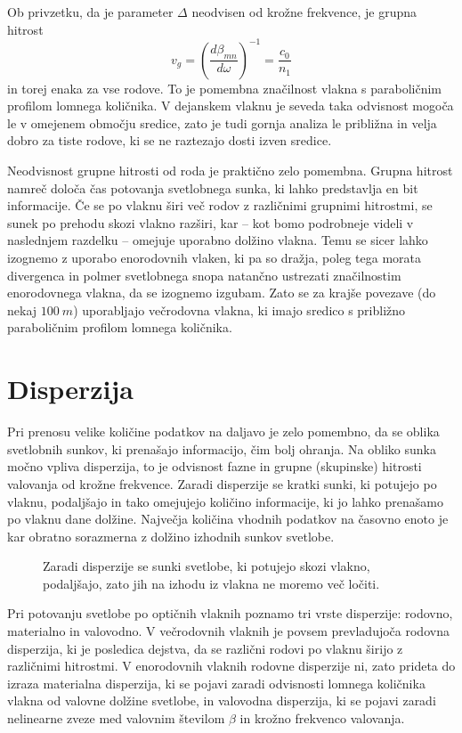 Ob privzetku, da je parameter $\Delta$ neodvisen od krožne frekvence, je grupna 
hitrost
\begin{equation}
v_{g}=\left(\frac{d\beta_{mn}}{d\omega}\right)^{-1}=\frac{c_{0}}{n_{1}}
\label{9.21}
\end{equation}
in torej enaka za vse rodove. To je pomembna značilnost vlakna s paraboličnim profilom
lomnega količnika. V dejanskem vlaknu je seveda taka odvisnost mogoča
le v omejenem območju sredice, zato je tudi gornja analiza le približna
in velja dobro za tiste rodove, ki se ne raztezajo dosti izven sredice.

Neodvisnost grupne hitrosti od roda je praktično zelo pomembna. 
Grupna hitrost namreč določa čas potovanja svetlobnega sunka, ki
lahko predstavlja en bit informacije. Če se po vlaknu širi več
rodov z različnimi grupnimi hitrostmi, se sunek po prehodu skozi
vlakno razširi, kar -- kot bomo podrobneje videli v naslednjem razdelku -- omejuje 
uporabno dolžino vlakna. Temu se sicer lahko izognemo z uporabo enorodovnih vlaken,
ki pa so dražja, poleg tega morata divergenca in polmer svetlobnega snopa 
natančno ustrezati značilnostim enorodovnega vlakna, da se izognemo izgubam. 
Zato se za krajše povezave (do nekaj $100~\si{m}$) uporabljajo večrodovna vlakna, ki imajo sredico s 
približno paraboličnim profilom lomnega količnika.

\section{Disperzija}
\label{chap:Disperzija}
Pri prenosu velike količine podatkov na daljavo je zelo pomembno, da
se oblika svetlobnih sunkov, ki prenašajo informacijo, čim bolj ohranja.
Na obliko sunka močno vpliva disperzija, to je odvisnost fazne in grupne (skupinske) hitrosti
valovanja od krožne frekvence. Zaradi disperzije se kratki sunki, ki potujejo po vlaknu, podaljšajo in 
tako omejujejo količino informacije, ki jo lahko prenašamo po vlaknu dane dolžine.
Največja količina vhodnih podatkov na časovno enoto je kar 
obratno sorazmerna z dolžino izhodnih sunkov svetlobe. 
\begin{figure}[h]
\centering
\def\svgwidth{120truemm} 
 
\caption{Zaradi disperzije se sunki svetlobe, ki potujejo skozi vlakno, 
podaljšajo, zato jih na izhodu iz vlakna ne moremo več ločiti.}
\label{fig:disp}
\end{figure}

Pri potovanju svetlobe po optičnih vlaknih poznamo tri 
vrste disperzije: rodovno, materialno in valovodno. V večrodovnih vlaknih
je povsem prevladujoča rodovna disperzija, ki je posledica dejstva, da se 
različni rodovi po vlaknu širijo z različnimi hitrostmi. 
V enorodovnih vlaknih rodovne disperzije ni, zato prideta do izraza 
materialna disperzija, ki se pojavi zaradi odvisnosti lomnega količnika 
vlakna od valovne dolžine svetlobe, in valovodna disperzija, ki se pojavi zaradi 
nelinearne zveze med valovnim številom $\beta$ in krožno frekvenco valovanja. 

